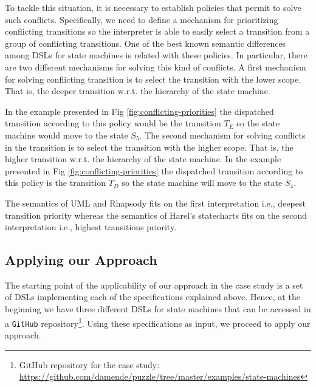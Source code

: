 To tackle this situation, it is necessary to establish policies that permit to solve such conflicts. Specifically, we need to define a mechanism for prioritizing conflicting transitions so the interpreter is able to easily select a transition from a group of conflicting transitions. One of the best known semantic differences among DSLs for state machines is related with these policies. In particular, there are two different mechanisms for solving this kind of conflicts. A first mechanism for solving conflicting transition is to select the transition with the lower scope. That is, the deeper transition w.r.t. the hierarchy of the state machine.

In the example presented in Fig \ref{fig:conflicting-priorities} the dispatched transition according to this policy would be the transition $T_E$ so the state machine would move to the state $S_5$. The second mechanism for solving conflicts in the transition is to select the transition with the higher scope. That is, the higher transition w.r.t. the hierarchy of the state machine. In the example presented in Fig \ref{fig:conflicting-priorities} the dispatched transition according to this policy is the transition $T_D$ so the state machine will move to the state $S_4$.

The semantics of UML and Rhapsody fits on the first interpretation i.e., deepest transition priority whereas the semantics of Harel's statecharts fits on the second interpretation i.e., highest transitions priority.


\subsection{Applying our Approach}

The starting point of the applicability of our approach in the case study is a set of DSLs implementing each of the specifications explained above. Hence, at the beginning we have three different DSLs for state machines that can be accessed in a \texttt{GitHub} repository\footnote{GitHub repository for the case study: \url{https://github.com/damende/puzzle/tree/master/examples/state-machines}}. Using these specifications as input, we proceed to apply our approach. 

